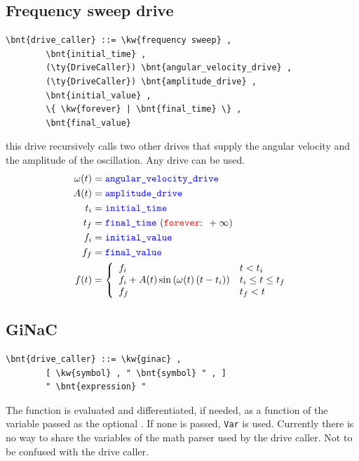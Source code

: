 \subsection{Frequency sweep drive}
\begin{Verbatim}[commandchars=\\\{\}]
    \bnt{drive_caller} ::= \kw{frequency sweep} ,
        \bnt{initial_time} ,
        (\ty{DriveCaller}) \bnt{angular_velocity_drive} ,
        (\ty{DriveCaller}) \bnt{amplitude_drive} ,
        \bnt{initial_value} ,
        \{ \kw{forever} | \bnt{final_time} \} ,
        \bnt{final_value}
\end{Verbatim}
this drive recursively calls two other drives that supply the angular velocity 
and the amplitude of the oscillation. Any drive can be used.
\begin{align}
	\omega(t) &= \nt{angular\_velocity\_drive}
	\nonumber \\
	A(t) &= \nt{amplitude\_drive}
	\nonumber \\
	t_i &= \nt{initial\_time}
	\nonumber \\
	t_f &= \nt{final\_time} \ (\text{\kw{forever}: } +\infty)
	\nonumber \\
	f_i &= \nt{initial\_value}
	\nonumber \\
	f_f &= \nt{final\_value}
	\nonumber \\
	f(t) &= \lcubr{\matr{ll}{
		f_i & t < t_i
		\\
		f_i + A(t) \sin\plbr{ \omega(t)\plbr{t - t_i} } & t_i \le t \le t_f
		\\
		f_f & t_f < t
	}}
\end{align}

\subsection{GiNaC}\label{sec:DRIVE:GINAC}
\begin{Verbatim}[commandchars=\\\{\}]
    \bnt{drive_caller} ::= \kw{ginac} ,
        [ \kw{symbol} , " \bnt{symbol} " , ]
        " \bnt{expression} "
\end{Verbatim}
The function  is evaluated and differentiated, if needed,
as a function of the variable passed as the optional .
If none is passed, \texttt{Var} is used.
Currently there is no way to share the variables of the math parser
used by the  drive caller.
Not to be confused with the  drive caller.

